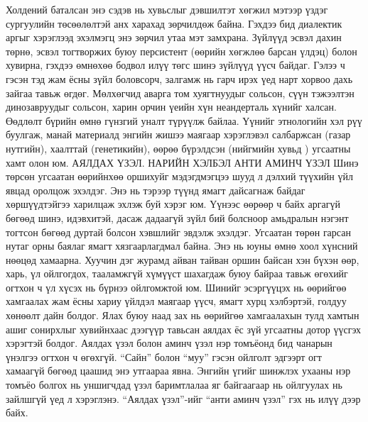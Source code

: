 Холдений баталсан энэ сэдэв нь хувьслыг дэвшилтэт хөгжил мэтээр үздэг сургуулийн төсөөлөлтэй анх харахад зөрчилдөж байна. Гэхдээ бид диалектик аргыг хэрэглээд эхэлмэгц энэ зөрчил утаа мэт замхрана. Зүйлүүд эсвэл дахин төрнө, эсвэл тогтворжих буюу персистент (өөрийн хөгжлөө барсан үлдэц) болон хувирна, гэхдээ өмнөхөө бодвол илүү төгс шинэ зүйлүүд үүсч байдаг. Гэлээ ч гэсэн тэд жам ёсны зүйл боловсорч, залгамж нь гарч ирэх үед нарт хорвоо дахь зайгаа тавьж өгдөг. Мөлхөгчид аварга том хуягтнуудыг сольсон, сүүн тэжээлтэн динозавруудыг сольсон, харин орчин үеийн хүн неандерталь хүнийг халсан. Өөдлөлт бүрийн өмнө гүнзгий уналт түрүүлж байлаа.
Үүнийг этнологийн хэл рүү буулгаж, манай материалд энгийн жишээ маягаар хэрэглэвэл салбаржсан (газар нутгийн), хаалттай (генетикийн), өөрөө бүрэлдсэн (нийгмийн хувьд ) угсаатны хамт олон юм.
АЯЛДАХ ҮЗЭЛ. НАРИЙН ХЭЛБЭЛ АНТИ АМИНЧ ҮЗЭЛ
Шинэ төрсөн угсаатан өөрийнхөө оршихуйг мэдэгдмэгцээ шууд л дэлхий түүхийн үйл явцад оролцож эхэлдэг. Энэ нь тэрээр түүнд ямагт дайсагнаж байдаг хөршүүдтэйгээ харилцаж эхлэж буй хэрэг юм. Үүнээс өөрөөр ч байх аргагүй бөгөөд шинэ, идэвхитэй, дасаж дадаагүй зүйл бий болсноор амьдралын нэгэнт тогтсон бөгөөд дуртай болсон хэвшлийг эвдэлж эхэлдэг. Угсаатан төрөн гарсан нутаг орны баялаг ямагт хязгаарлагдмал байна. Энэ нь юуны өмнө хоол хүнсний нөөцөд хамаарна. Хуучин дэг журамд айван тайван оршин байсан хэн бүхэн өөр, харь, үл ойлгогдох, тааламжгүй хүмүүст шахагдаж буюу байраа тавьж өгөхийг огтхон ч үл хүсэх нь бүрнээ ойлгомжтой юм. Шинийг эсэргүүцэх нь өөрийгөө хамгаалах жам ёсны хариу үйлдэл маягаар үүсч, ямагт хурц хэлбэртэй, голдуу хөнөөлт дайн болдог. Ялах буюу наад зах нь өөрийгөө хамгаалахын тулд хамтын ашиг сонирхлыг хувийнхаас дээгүүр тавьсан аялдах ёс зүй угсаатны дотор үүсгэх хэрэгтэй болдог.
Аялдах үзэл болон аминч үзэл нэр томъёонд бид чанарын үнэлгээ огтхон ч өгөхгүй. “Сайн” болон “муу” гэсэн ойлголт эдгээрт огт хамаагүй бөгөөд цаашид энэ утгаараа явна. Энгийн үгийг шинжлэх ухааны нэр томъёо болгох нь уншигчдад үзэл баримтлалаа яг байгаагаар нь ойлгуулах нь зайлшгүй үед л хэрэглэнэ. “Аялдах үзэл”-ийг “анти аминч үзэл” гэх нь илүү дээр байх.
